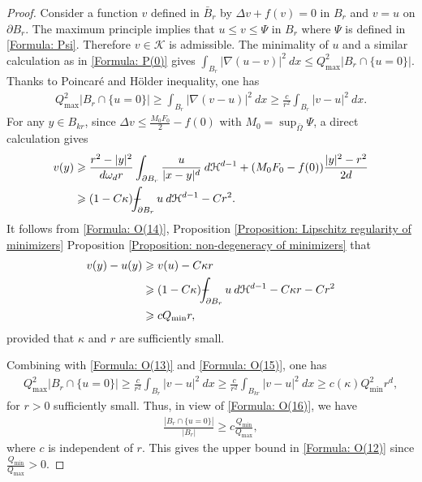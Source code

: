 \documentclass[11pt,reqno]{amsart}
\begin{document}
\begin{proof}
	 Consider a function $v$ defined in $\bar{B}_{r}$ by $\Delta v+f(v)=0$ in $B_{r}$ and $v=u$ on $\partial B_{r}$. The maximum principle implies that $u\leqslant v\leqslant\Psi$ in $B_{r}$ where $\Psi$ is defined in \eqref{Formula: Psi}. Therefore $v\in\mathcal{K}$ is admissible. The minimality of $u$ and a similar calculation as in \eqref{Formula: P(0)} gives $\int_{B_{r}}|\nabla(u-v)|^{2}\:dx\leqslant Q_{\mathrm{max}}^{2}|B_{r}\cap\{u=0\}|$. Thanks to Poincar\'{e} and H\"{o}lder inequality, one has
     \begin{align}\label{Formula: O(13)}
     	Q_{\mathrm{max}}^{2}|B_{r}\cap\{u=0\}|\geqslant\int_{B_{r}}|\nabla(v-u)|^{2}\:dx\geqslant\frac{c}{r^{2}}\int_{B_{r}}|v-u|^{2}\:dx.
     \end{align}
     For any $y\in B_{kr}$, since $\Delta v\leqslant \frac{M_{0}F_{0}}{2}-f(0)$ with $M_{0}=\sup_{\bar{\Omega}}\Psi$, a direct calculation gives
     \begin{align}\label{Formula: O(14)}
     	\begin{alignedat}{2}
     		v(y)&\geqslant\frac{r^{2}-|y|^{2}}{d\omega_{d}r}\int_{\partial B_{r}}\frac{u}{|x-y|^{d}}\:d\mathcal{H}^{d-1}+(M_{0}F_{0}-f(0))\frac{|y|^{2}-r^{2}}{2d}\\
     		&\geqslant(1-C\kappa)\dashint_{\partial B_{r}}u\:d\mathcal{H}^{d-1}-Cr^{2}.
     	\end{alignedat}
     \end{align}
     It follows from \eqref{Formula: O(14)}, Proposition \ref{Proposition: Lipschitz regularity of minimizers} Proposition \ref{Proposition: non-degeneracy of minimizers} that
     \begin{align}\label{Formula: O(15)}
     	\begin{alignedat}{3}
     		v(y)-u(y)&\geqslant v(u)-C\kappa r\\
     		&\geqslant(1-C\kappa)\dashint_{\partial B_{r}}u\:d\mathcal{H}^{d-1}-C\kappa r-Cr^{2}\\
     		&\geqslant cQ_{\mathrm{min}}r,
     	\end{alignedat}
     \end{align}
     provided that $\kappa$ and $r$ are sufficiently small. 
     
     Combining with \eqref{Formula: O(13)} and \eqref{Formula: O(15)}, one has
     \begin{align}\label{Formula: O(16)}
     	Q_{\mathrm{max}}^{2}|B_{r}\cap\{u=0\}|\geqslant\frac{c}{r^{2}}\int_{B_{r}}|v-u|^{2}\:dx\geqslant\frac{c}{r^{2}}\int_{B_{kr}}|v-u|^{2}\:dx\geqslant c(\kappa)Q_{\mathrm{min}}^{2}r^{d},
     \end{align}
     for $r>0$ sufficiently small. Thus, in view of \eqref{Formula: O(16)}, we have
     \begin{align*}
     	\frac{|B_{r}\cap\{u=0\}|}{|B_{r}|}\geqslant c\frac{Q_{\mathrm{min}}}{Q_{\mathrm{max}}},
     \end{align*}
     where $c$ is independent of $r$. This gives the upper bound in \eqref{Formula: O(12)} since $\frac{Q_{\mathrm{min}}}{Q_{\mathrm{max}}}>0$.
\end{proof}
\end{document}
